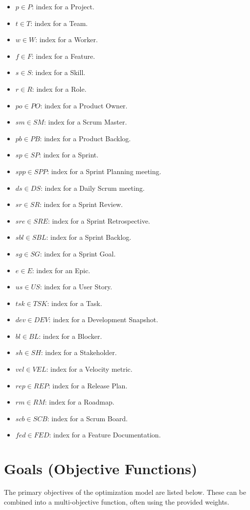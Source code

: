 \documentclass[11pt]{article}
\begin{document}
\begin{itemize}
    \item $p \in P$: index for a Project.
    \item $t \in T$: index for a Team.
    \item $w \in W$: index for a Worker.
    \item $f \in F$: index for a Feature.
    \item $s \in S$: index for a Skill.
    \item $r \in R$: index for a Role.
    \item $po \in PO$: index for a Product Owner.
    \item $sm \in SM$: index for a Scrum Master.
    \item $pb \in PB$: index for a Product Backlog.
    \item $sp \in SP$: index for a Sprint.
    \item $spp \in SPP$: index for a Sprint Planning meeting.
    \item $ds \in DS$: index for a Daily Scrum meeting.
    \item $sr \in SR$: index for a Sprint Review.
    \item $sre \in SRE$: index for a Sprint Retrospective.
    \item $sbl \in SBL$: index for a Sprint Backlog.
    \item $sg \in SG$: index for a Sprint Goal.
    \item $e \in E$: index for an Epic.
    \item $us \in US$: index for a User Story.
    \item $tsk \in TSK$: index for a Task.
    \item $dev \in DEV$: index for a Development Snapshot.
    \item $bl \in BL$: index for a Blocker.
    \item $sh \in SH$: index for a Stakeholder.
    \item $vel \in VEL$: index for a Velocity metric.
    \item $rep \in REP$: index for a Release Plan.
    \item $rm \in RM$: index for a Roadmap.
    \item $scb \in SCB$: index for a Scrum Board.
    \item $fed \in FED$: index for a Feature Documentation.
\end{itemize}

\section{Goals (Objective Functions)}
The primary objectives of the optimization model are listed below. These can be combined into a multi-objective function, often using the provided weights.
\end{document}
